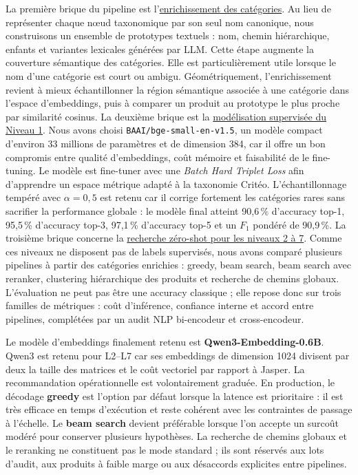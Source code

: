 \documentclass[12pt,a4paper]{report}
\begin{document}
La première brique du pipeline est l'\hyperref[chap:category-enrichment]{enrichissement des catégories}. Au lieu de représenter chaque nœud taxonomique par son seul nom canonique, nous construisons un ensemble de prototypes textuels : nom, chemin hiérarchique, enfants et variantes lexicales générées par LLM. Cette étape augmente la couverture sémantique des catégories. Elle est particulièrement utile lorsque le nom d'une catégorie est court ou ambigu. Géométriquement, l'enrichissement revient à mieux échantillonner la région sémantique associée à une catégorie dans l'espace d'embeddings, puis à comparer un produit au prototype le plus proche par similarité cosinus.
La deuxième brique est la \hyperref[chap:l1-supervised]{modélisation supervisée du Niveau 1}. Nous avons choisi \texttt{BAAI/bge-small-en-v1.5}, un modèle compact d'environ 33 millions de paramètres et de dimension 384, car il offre un bon compromis entre qualité d'embeddings, coût mémoire et faisabilité de le fine-tuning. Le modèle est fine-tuner avec une \textit{Batch Hard Triplet Loss} afin d'apprendre un espace métrique adapté à la taxonomie Critéo. L'échantillonnage tempéré avec $\alpha=0{,}5$ est retenu car il corrige fortement les catégories rares sans sacrifier la performance globale : le modèle final atteint 90{,}6\,\% d'accuracy top-1, 95{,}5\,\% d'accuracy top-3, 97{,}1\,\% d'accuracy top-5 et un $F_1$ pondéré de 90{,}9\,\%.
La troisième brique concerne la \hyperref[chap:l2-l7-zero-shot]{recherche zéro-shot pour les niveaux 2 à 7}. Comme ces niveaux ne disposent pas de labels supervisés, nous avons comparé plusieurs pipelines à partir des catégories enrichies : greedy, beam search, beam search avec reranker, clustering hiérarchique des produits et recherche de chemins globaux. L'évaluation ne peut pas être une accuracy classique ; elle repose donc sur trois familles de métriques : coût d'inférence, confiance interne et accord entre pipelines, complétées par un audit NLP bi-encodeur et cross-encodeur.

Le modèle d'embeddings finalement retenu est \textbf{Qwen3-Embedding-0.6B}. Qwen3 est retenu pour L2--L7 car ses embeddings de dimension 1024 divisent par deux la taille des matrices et le coût vectoriel par rapport à Jasper. 
La recommandation opérationnelle est volontairement graduée. En production, le décodage \textbf{greedy} est l'option par défaut lorsque la latence est prioritaire : il est très efficace en temps d'exécution et reste cohérent avec les contraintes de passage à l'échelle. Le \textbf{beam search} devient préférable lorsque l'on accepte un surcoût modéré pour conserver plusieurs hypothèses. La recherche de chemins globaux et le reranking ne constituent pas le mode standard ; ils sont réservés aux lots d'audit, aux produits à faible marge ou aux désaccords explicites entre pipelines.
\end{document}

